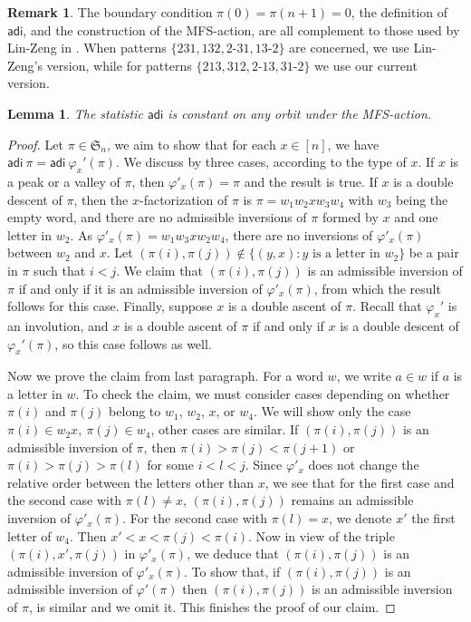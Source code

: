 \documentclass[12pt,reqno]{amsart}
\numberwithin{equation}{section}
\theoremstyle{plain}
\newtheorem{lemma}[theorem]{Lemma}
\theoremstyle{definition}
\newtheorem{remark}[theorem]{Remark}
\def\S{\mathfrak{S}}
\def\ai{\mathsf{adi}}
\def\cab{31\text{-}2}
\def\bca{2\text{-}31}
\def\acb{13\text{-}2}
\def\bac{2\text{-}13}
\begin{document}
\begin{remark}\label{dual}
The boundary condition $\pi(0)=\pi(n+1)=0$, the definition of $\ai$, and the construction of the MFS-action, are all complement to those used by Lin-Zeng in \cite{LZ15}. When patterns $\{231, 132, \bca, \acb\}$ are concerned, we use Lin-Zeng's version, while for patterns $\{213, 312, \bac, \cab\}$ we use our current version.
\end{remark}
\begin{lemma}\label{lemact}
The statistic $\ai$ is constant on any orbit under the MFS-action.
\end{lemma}
\begin{proof}
Let $\pi\in\S_n$, we aim to show that for each $x\in [n]$, we have $\ai\:\pi=\ai\:\varphi_x'(\pi)$. We discuss by three cases, according to the type of $x$. If $x$ is a peak or a valley of $\pi$, then $\varphi'_x(\pi)=\pi$ and the result is true. If $x$ is a double descent of $\pi$, then the $x$-factorization of $\pi$ is $\pi=w_1w_2xw_3w_4$ with $w_3$ being the empty word, and there are no admissible inversions of $\pi$ formed by $x$ and one letter in $w_2$. As $\varphi'_x(\pi)=w_1w_3xw_2w_4$, there are no inversions of $\varphi'_x(\pi)$ between $w_2$ and $x$. Let $(\pi(i),\pi(j))\notin\{(y, x) : \text{$y$ is a letter in $w_2$}\}$ be a pair in $\pi$ such that $i<j$. We claim that $(\pi(i),\pi(j))$ is an admissible inversion of $\pi$ if and only if it is an  admissible inversion of $\varphi'_x(\pi)$, from which the result follows for this case. Finally, suppose $x$ is a double ascent of $\pi$. Recall that $\varphi_x'$ is an involution, and $x$ is a double ascent of $\pi$ if and only if $x$ is a double descent of $\varphi_x'(\pi)$, so this case follows as well.

Now we prove the claim from last paragraph. For a word $w$, we write $a\in w$ if $a$ is a letter in $w$. To check the claim, we must consider cases depending on whether $\pi(i)$ and $\pi(j)$ belong to $w_1$, $w_2$, $x$, or $w_4$.
 We will show only the case $\pi(i)\in w_2x, \:\pi(j)\in w_4$, other cases are similar. If $(\pi(i),\pi(j))$ is an admissible inversion of $\pi$, then $\pi(i)>\pi(j)<\pi(j+1)$ or $\pi(i)>\pi(j)>\pi(l)$ for some $i<l<j$. Since $\varphi'_x$ does not change the relative order between the letters other than $x$, we see that for the first case and the second case with $\pi(l)\ne x$, $(\pi(i),\pi(j))$ remains an admissible inversion of $\varphi'_x(\pi)$. For the second case with $\pi(l)=x$, we denote $x'$ the first letter of $w_4$. Then $x'<x<\pi(j)<\pi(i)$. Now in view of the triple $(\pi(i),x',\pi(j))$ in $\varphi'_x(\pi)$, we deduce that $(\pi(i),\pi(j))$ is an admissible inversion of $\varphi'_x(\pi)$. To show that, if $(\pi(i),\pi(j))$ is an admissible inversion of $\varphi'(\pi)$ then $(\pi(i),\pi(j))$ is an admissible inversion of $\pi$, is similar and we omit it. This finishes the proof of our claim.
\end{proof}
\end{document}

